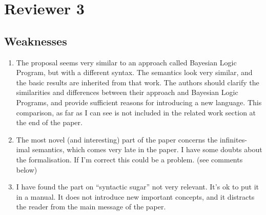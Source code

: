 \section{Reviewer 3}










\subsection{Weaknesses}

\begin{enumerate}
    \setcounter{enumi}{0}

\item The proposal seems very similar to an approach called Bayesian Logic
Program, but with a different syntax. The semantics look very similar, and
the basic results are inherited from that work. The authors should clarify
the similarities and differences between their approach and Bayesian Logic
Programs, and provide sufficient reasons for introducing a new language.
This comparison, as far as I can see is not included in the related work
section at the end of the paper.


\item The most novel (and interesting) part of the paper concerns the infinites-
imal semantics, which comes very late in the paper. I have some doubts
about the formalisation. If I’m correct this could be a problem. (see
comments below)


\item I have found the part on “syntactic sugar” not very relevant. It’s ok to
put it in a manual. It does not introduce new important concepts, and it
distracts the reader from the main message of the paper.



\end{enumerate}
